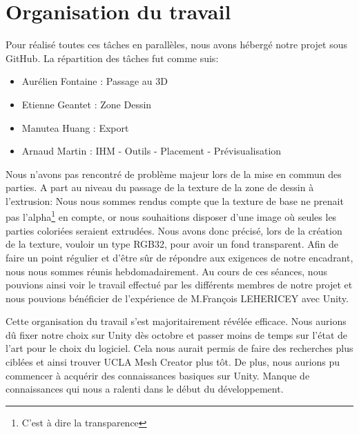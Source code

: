 \documentclass[a4paper,11pt]{article}
\begin{document}
	\section{Organisation du travail}
				
				Pour réalisé toutes ces tâches en parallèles, nous avons hébergé notre projet sous GitHub. La répartition des tâches fut comme suis:
					\begin{itemize}

			\item	 Aurélien Fontaine : Passage au 3D
			\item	 Etienne Geantet : Zone Dessin
			\item	 Manutea Huang : Export
			\item	 Arnaud Martin : IHM - Outils - Placement - Prévisualisation
							
					\end{itemize}
				Nous n'avons pas rencontré de problème majeur lors de la mise en commun des parties. A part au niveau du passage de la texture de la zone de dessin à l'extrusion:
				 Nous nous sommes rendus compte que la texture de base ne prenait pas l'alpha\footnote{C'est à dire la transparence} en compte, or nous souhaitions disposer d'une image où seules les parties coloriées seraient extrudées. Nous avons donc précisé, lors de la création de la texture, vouloir un type RGB32, pour avoir un fond transparent.
				Afin de faire un point régulier et d'être sûr de répondre aux exigences de notre encadrant, nous nous sommes réunis hebdomadairement. Au cours de ces séances, nous pouvions ainsi voir le travail effectué par les différents membres de notre projet et nous pouvions bénéficier de l'expérience de M.François LEHERICEY avec Unity.
				
				Cette organisation du travail s'est majoritairement révélée efficace. Nous aurions dû fixer notre choix sur Unity dès octobre et passer moins de temps sur l'état de l'art pour le choix du logiciel. Cela nous aurait permis de faire des recherches plus ciblées et ainsi trouver UCLA Mesh Creator plus tôt. De plus, nous aurions pu commencer à acquérir des connaissances basiques sur Unity. Manque de connaissances qui nous a ralenti dans le début du développement.
			
	
	
\end{document}
